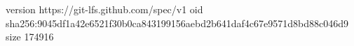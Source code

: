 version https://git-lfs.github.com/spec/v1
oid sha256:9045df1a42e6521f30b0ca843199156aebd2b641daf4c67e9571d8bd88c046d9
size 174916
